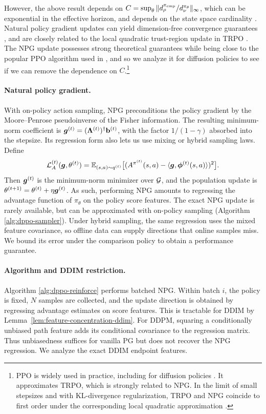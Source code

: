 However, the above result depends on $C=\sup_\theta\|d_\rho^{\pi_{\rm cmp}}/d_\nu^{\pi_\theta}\|_\infty$, which can be exponential in the effective horizon, and depends on the state space cardinality \citep{agarwal2021theory}. Natural policy gradient updates \citep{kakade2001natural} can yield dimension-free convergence guarantees \citep{agarwal2021theory, cen2022fast}, and are closely related to the local quadratic trust-region update in TRPO \citep{schulman2015trust}. The NPG update possesses strong theoretical guarantees while being close to the popular PPO algorithm \citep{schulman2017proximal} used in \citet{ren2024diffusionpolicypolicyoptimization}, and so we analyze it for diffusion policies to see if we can remove the dependence on $C$.\footnote{PPO is widely used in practice, including for diffusion policies \citep{ren2024diffusionpolicypolicyoptimization}. It approximates TRPO, which is strongly related to NPG. In the limit of small stepsizes and with KL-divergence regularization, TRPO and NPG coincide to first order under the corresponding local quadratic approximation \citep{schulman2015trust, neu2017unified, rajeswaran2017learning}.}


\paragraph{Natural policy gradient.}
With on-policy action sampling, NPG preconditions the policy gradient by the Moore--Penrose pseudoinverse of the Fisher information. The resulting minimum-norm coefficient is $\bm{g}^{(t)}=(\boldsymbol{\Lambda}^{(t)})^\dagger\mathbf{b}^{(t)}$, with the factor $1/(1-\gamma)$ absorbed into the stepsize. Its regression form also lets us use mixing or hybrid sampling laws. Define
\[
{\mathcal{L}}_A^{(t)}(\bm{g},\theta^{(t)})
=\mathbb{E}_{(s,a)\sim q^{(t)}}\big[(A^{\pi^{(t)}}(s,a)-\langle\bm{g},\boldsymbol{\phi}^{(t)}(s,a)\rangle)^2\big].
\]
Then $\bm{g}^{(t)}$ is the minimum-norm minimizer over ${\mathcal{G}}$, and the population update is $\theta^{(t+1)}=\theta^{(t)}+\eta\bm{g}^{(t)}$.
As such, performing NPG amounts to regressing the advantage function of $\pi_\theta$ on the policy score features. The exact NPG update is rarely available, but can be approximated with on-policy sampling (Algorithm \ref{alg:dppo-sampler}). Under hybrid sampling, the same regression uses the mixed feature covariance, so offline data can supply directions that online samples miss. We bound its error under the comparison policy to obtain a performance guarantee. 


\paragraph{Algorithm and DDIM restriction.} Algorithm \ref{alg:dppo-reinforce} performs batched NPG. Within batch $i$, the policy is fixed, $N$ samples are collected,
and the update direction is obtained by regressing advantage estimates on score features.
This is tractable for DDIM by Lemma~\ref{lem:feature-concentration-ddim}. For DDPM, squaring a conditionally unbiased path feature adds its conditional covariance to the regression matrix. Thus unbiasedness suffices for vanilla PG but does not recover the NPG regression. We analyze the exact DDIM endpoint features.

